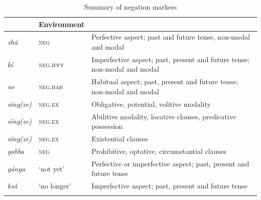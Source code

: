 \documentclass[output=paper,colorlinks,citecolor=brown]{langscibook}
\begin{document}
\begin{table}
\begin{tabularx}{\textwidth}{llQ}
    \lsptoprule
     & {Environment}\\
    \midrule
    \textit{zhá} & \textsc{neg} & {Perfective aspect; past and future tense, non-modal and modal}\\
    \tablevspace
    \textit{kí}  & \textsc{neg.ipfv} & {Imperfective aspect; past, present and future tense; non-modal and modal}\\
    \tablevspace
    \textit{ne}  & \textsc{neg.hab} & {Habitual aspect; past, present and future tense; non-modal and modal}\\
    \tablevspace
    \textit{sïng(ze)}  & \textsc{neg.ex} & {Obligative, potential, volitive modality}\\
    \tablevspace
    \textit{sïng(ze)}  & \textsc{neg.ex} & {Abilitive modality, locative clauses, predicative possession}\\
    \tablevspace
    \textit{sïng(ze)}  & \textsc{neg.ex} & {Existential clauses}\\
    \tablevspace
    \textit{gabba} & \textsc{neg} & {Prohibitive, optative, circumstantial clauses}\\
    \tablevspace
    \textit{gánga}  & {‘not yet’} & {Perfective or imperfective aspect; past, present and future tense}\\
    \tablevspace
    \textit{ksá}  & {‘no longer’} & {Imperfective aspect; past, present and future tense}\\
    \lspbottomrule
\end{tabularx}
\caption{Summary of negation markers}
\label{tab:kog:7}
\end{table}
\end{document}
